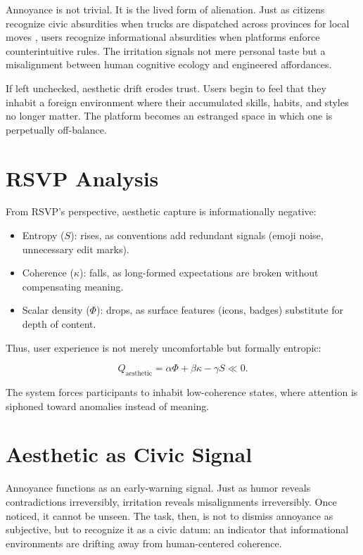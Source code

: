 \documentclass[openany]{book}
\begin{document}
Annoyance is not trivial. It is the lived form of alienation. Just as citizens recognize civic absurdities when trucks are dispatched across provinces for local moves \cite{toronto2025}, users recognize informational absurdities when platforms enforce counterintuitive rules. The irritation signals not mere personal taste but a misalignment between human cognitive ecology and engineered affordances.

If left unchecked, aesthetic drift erodes trust. Users begin to feel that they inhabit a foreign environment where their accumulated skills, habits, and styles no longer matter. The platform becomes an estranged space in which one is perpetually off-balance.

\section{RSVP Analysis}

From RSVP’s perspective, aesthetic capture is informationally negative:

\begin{itemize}
    \item Entropy ($S$): rises, as conventions add redundant signals (emoji noise, unnecessary edit marks).
    \item Coherence ($\kappa$): falls, as long-formed expectations are broken without compensating meaning.
    \item Scalar density ($\Phi$): drops, as surface features (icons, badges) substitute for depth of content.
\end{itemize}

Thus, user experience is not merely uncomfortable but formally entropic:

\[ Q_{\text{aesthetic}} = \alpha \Phi + \beta \kappa - \gamma S \ll 0. \]

The system forces participants to inhabit low-coherence states, where attention is siphoned toward anomalies instead of meaning.

\section{Aesthetic as Civic Signal}

Annoyance functions as an early-warning signal. Just as humor reveals contradictions irreversibly, irritation reveals misalignments irreversibly. Once noticed, it cannot be unseen. The task, then, is not to dismiss annoyance as subjective, but to recognize it as a civic datum: an indicator that informational environments are drifting away from human-centered coherence.
\end{document}
